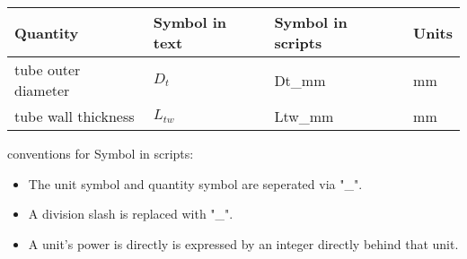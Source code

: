 \documentclass{report}
\begin{document}
\begin{tabular}{llll}
	Quantity & Symbol in text & Symbol in scripts & Units \\
	\hline
	tube outer diameter & $D_t$ & Dt\_mm & mm \\
	tube wall thickness & $L_{tw}$ & Ltw\_mm & mm 
\end{tabular}


conventions for Symbol in scripts:
\begin{itemize}  
	\item The unit symbol and quantity symbol are seperated via "\_".
	\item A division slash is replaced with "\_".
	\item A unit's power is directly is expressed by an integer directly behind that unit.
\end{itemize}
\end{document}
